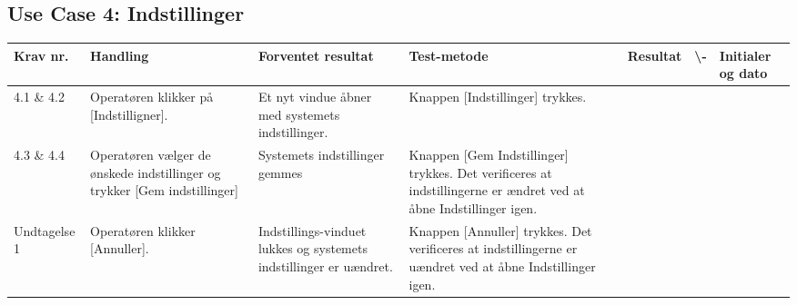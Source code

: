 \subsection{Use Case 4: Indstillinger}
\begin{center}
		\begin{longtable}{ | m{1.785cm} | m{1.785cm}| m{1.785cm}| m{1.785cm}| m{1.785cm}| m{1.785cm}|m{1.785cm}| } 
			\hline
			\textbf{Krav nr.} &\textbf{ Handling} & \textbf{Forventet resultat} & \textbf{Test-metode} &\textbf{Resultat} & \textbf{ \checkmark \textbackslash -} & \textbf{Initialer og dato} \\ 
			
			\hline
			4.1 \& 4.2 &  Operatøren klikker på [Indstilligner]. & Et nyt vindue åbner med systemets indstillinger. & Knappen [Indstillinger] trykkes.  &  & & \\
			\hline
			
			
			4.3 \& 4.4  &  Operatøren vælger de ønskede indstillinger og trykker [Gem indstillinger] & Systemets indstillinger gemmes & Knappen [Gem Indstillinger] trykkes. Det verificeres at indstillingerne er ændret ved at åbne Indstillinger igen. &  & & \\
			\hline
			
			Undtagelse 1 &  Operatøren klikker [Annuller].  & Indstillings-vinduet lukkes og systemets indstillinger er uændret. & Knappen [Annuller] trykkes. Det verificeres at indstillingerne er uændret ved at åbne Indstillinger igen. &  & & \\
			\hline
			

			
			
		\end{longtable}
		
	\end{center}
	\pagebreak